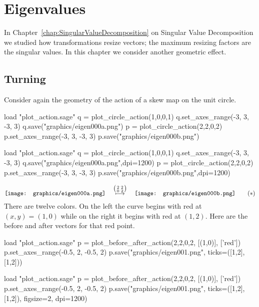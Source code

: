 \chapter{Eigenvalues}

In Chapter~\ref{chap:SingularValueDecomposition} on 
Singular Value Decomposition we studied how
transformations resize vectors; the maximum resizing factors
are the singular values.
In this chapter we consider another geometric effect.


\section{Turning}
Consider again the geometry of the action of a skew map on the unit circle.
\begin{sageoutput}
load "plot_action.sage"  
q = plot_circle_action(1,0,0,1) 
q.set_axes_range(-3, 3, -3, 3) 
q.save("graphics/eigen000a.png")
p = plot_circle_action(2,2,0,2) 
p.set_axes_range(-3, 3, -3, 3) 
p.save("graphics/eigen000b.png")
\end{sageoutput}
\begin{sagesilent}
load "plot_action.sage"  
q = plot_circle_action(1,0,0,1) 
q.set_axes_range(-3, 3, -3, 3) 
q.save("graphics/eigen000a.png",dpi=1200)
p = plot_circle_action(2,2,0,2) 
p.set_axes_range(-3, 3, -3, 3) 
p.save("graphics/eigen000b.png",dpi=1200)
\end{sagesilent}
\begin{equation*}
  \vcenteredhbox{\texttt{[image: graphics/eigen000a.png]}}
  \quad\mapsunder{\big (\begin{smallmatrix} 2 &2 \\ 0 &2 \end{smallmatrix}\big )}\quad
  \vcenteredhbox{\texttt{[image: graphics/eigen000b.png]}}
  \tag{$*$}
\end{equation*}
There are twelve colors.
On the left the curve begins with red at $(x,y)=(1,0)$
while on the right it begins with red at $(1,2)$.
Here are the before and after vectors for that red point.
\begin{sageoutput}[d,0,1;d,2,4]
load "plot_action.sage"  
p = plot_before_after_action(2,2,0,2, [(1,0)], ['red']) 
p.set_axes_range(-0.5, 2, -0.5, 2) 
p.save("graphics/eigen001.png", ticks=([1,2],[1,2]))
\end{sageoutput}
\begin{sagesilent}
load "plot_action.sage"  
p = plot_before_after_action(2,2,0,2, [(1,0)], ['red']) 
p.set_axes_range(-0.5, 2, -0.5, 2) 
p.save("graphics/eigen001.png", ticks=([1,2],[1,2]), figsize=2, dpi=1200)
\end{sagesilent}
